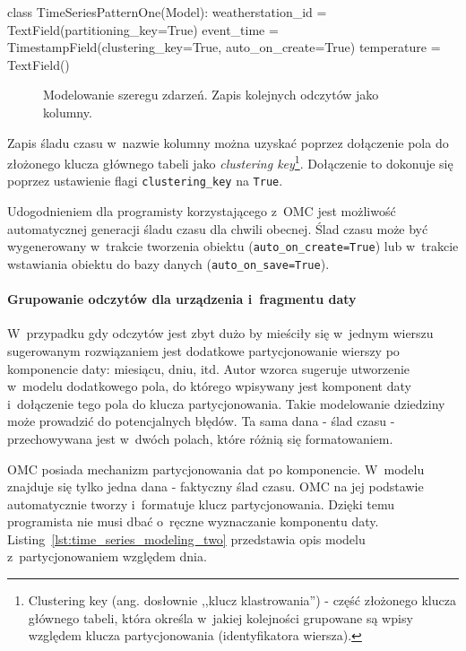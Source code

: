 \begin{verbbox}[\footnotesize]
class TimeSeriesPatternOne(Model):
    weatherstation_id = TextField(partitioning_key=True)
    event_time = TimestampField(clustering_key=True, auto_on_create=True)
    temperature = TextField()
\end{verbbox}

\begin{figure}[ht!]
	\centering
	\theverbbox
	\caption{Modelowanie szeregu zdarzeń. Zapis kolejnych odczytów jako kolumny.}
	\label{lst:time_series_modeling_one}
\end{figure}

Zapis śladu czasu w~nazwie kolumny można uzyskać poprzez dołączenie pola do złożonego klucza głównego tabeli jako \emph{clustering key}\footnote{Clustering key (ang. dosłownie ,,klucz klastrowania'') - część złożonego klucza głównego tabeli, która określa w~jakiej kolejności grupowane są wpisy względem klucza partycjonowania (identyfikatora wiersza).}. Dołączenie to dokonuje się poprzez ustawienie flagi \verb+clustering_key+ na \verb+True+. 

Udogodnieniem dla programisty korzystającego z~OMC jest możliwość automatycznej generacji śladu czasu dla chwili obecnej. Ślad czasu może być wygenerowany w~trakcie tworzenia obiektu (\verb+auto_on_create=True+) lub w~trakcie wstawiania obiektu do bazy danych (\verb+auto_on_save=True+).  

\paragraph{Grupowanie odczytów dla urządzenia i~fragmentu daty} 

W~przypadku gdy odczytów jest zbyt dużo by mieściły się w~jednym wierszu sugerowanym rozwiązaniem jest dodatkowe partycjonowanie wierszy po komponencie daty: miesiącu, dniu, itd. Autor wzorca sugeruje utworzenie w~modelu dodatkowego pola, do którego wpisywany jest komponent daty i~dołączenie tego pola do klucza partycjonowania. Takie modelowanie dziedziny może prowadzić do potencjalnych błędów. Ta sama dana - ślad czasu - przechowywana jest w~dwóch polach, które różnią się formatowaniem. 

OMC posiada mechanizm partycjonowania dat po komponencie. W~modelu znajduje się tylko jedna dana - faktyczny ślad czasu. OMC na jej podstawie automatycznie tworzy i~formatuje klucz partycjonowania. Dzięki temu programista nie musi dbać o~ręczne wyznaczanie komponentu daty. Listing~\ref{lst:time_series_modeling_two} przedstawia opis modelu z~partycjonowaniem względem dnia.


